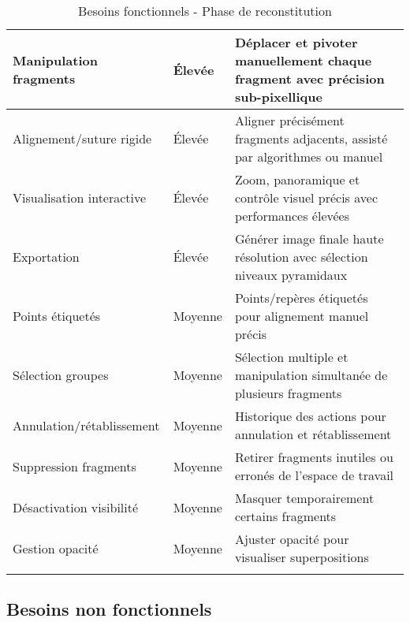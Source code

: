 \documentclass[12pt,a4paper]{report}
\begin{document}
\begin{}
\begin{}
\begin{longtable}{|p{3.5cm}|p{1.5cm}|p{9cm}|}
Manipulation fragments & Élevée & Déplacer et pivoter manuellement chaque fragment avec précision sub-pixellique \\
\hline

Alignement/suture rigide & Élevée & Aligner précisément fragments adjacents, assisté par algorithmes ou manuel \\
\hline

Visualisation interactive & Élevée & Zoom, panoramique et contrôle visuel précis avec performances élevées \\
\hline

Exportation & Élevée & Générer image finale haute résolution avec sélection niveaux pyramidaux \\
\hline

Points étiquetés & Moyenne & Points/repères étiquetés pour alignement manuel précis \\
\hline

Sélection groupes & Moyenne & Sélection multiple et manipulation simultanée de plusieurs fragments \\
\hline

Annulation/rétablissement & Moyenne & Historique des actions pour annulation et rétablissement \\
\hline

Suppression fragments & Moyenne & Retirer fragments inutiles ou erronés de l'espace de travail \\
\hline

Désactivation visibilité & Moyenne & Masquer temporairement certains fragments \\
\hline

Gestion opacité & Moyenne & Ajuster opacité pour visualiser superpositions \\
\hline

\caption{Besoins fonctionnels - Phase de reconstitution}
\end{longtable}

\subsection{Besoins non fonctionnels}

\vspace{1em}
\end{}
\end{}
\end{document}

